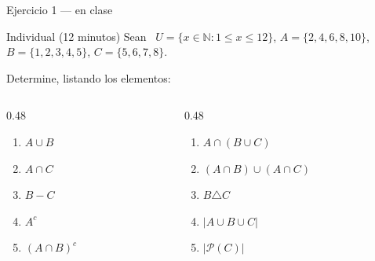 \documentclass[aspectratio=169,10pt]{beamer}
\begin{document}
\begin{frame}{Ejercicio 1 — en clase}
  \begin{alertblock}{Individual (12 minutos)}
    \scriptsize
    Sean \ $U = \{x \in \mathbb{N} : 1 \le x \le 12\}$, \quad
    $A = \{2,4,6,8,10\}$, \quad $B = \{1,2,3,4,5\}$, \quad
    $C = \{5,6,7,8\}$.

    \vspace{0.25cm}
    Determine, listando los elementos:

    \vspace{0.15cm}
    \begin{columns}[T,onlytextwidth]
      \begin{column}{0.48\textwidth}
        \begin{enumerate}\setlength{\itemsep}{0.02cm}
          \item $A \cup B$
          \item $A \cap C$
          \item $B - C$
          \item $A^{c}$
          \item $(A \cap B)^{c}$
        \end{enumerate}
      \end{column}
      \begin{column}{0.48\textwidth}
        \begin{enumerate}\setlength{\itemsep}{0.02cm}
          \setcounter{enumi}{5}
          \item $A \cap (B \cup C)$
          \item $(A\cap B)\cup(A\cap C)$
          \item $B \triangle C$
          \item $|A \cup B \cup C|$
          \item $|\mathcal{P}(C)|$
        \end{enumerate}
      \end{column}
    \end{columns}
  \end{alertblock}
\end{frame}
\end{document}
